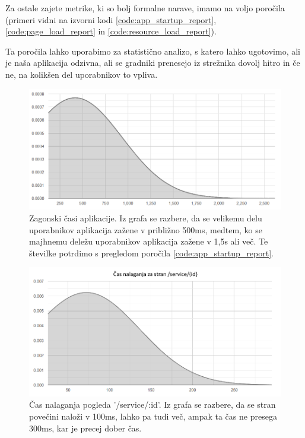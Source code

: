 \documentclass[a4paper, 12pt]{book}
\begin{document}
Za ostale zajete metrike, ki so bolj formalne narave, imamo na voljo poročila (primeri vidni na  izvorni kodi \ref{code:app_startup_report}, \ref{code:page_load_report} in \ref{code:resource_load_report}).

Ta poročila lahko uporabimo za statistično analizo, s katero lahko ugotovimo, ali je naša aplikacija odzivna, ali se gradniki prenesejo iz strežnika dovolj hitro in če ne, na kolikšen del uporabnikov to vpliva.

\begin{figure}[h]
	\begin{center}
		\includegraphics[width=1\textwidth]{app_startup_graph.png}
	\end{center}
	\caption{Zagonski časi aplikacije. Iz grafa se razbere, da se velikemu delu uporabnikov aplikacija zažene v približno 500ms, medtem, ko se majhnemu deležu uporabnikov aplikacija zažene v 1,5s ali več. Te številke potrdimo s pregledom poročila \ref{code:app_startup_report}.}
	\label{img:graph_app_startup}
\end{figure}

\begin{figure}[h]
	\begin{center}
		\includegraphics[width=1\textwidth]{page_load_graph_service_details.png}
	\end{center}
	\caption{Čas nalaganja pogleda '/service/:id'. Iz grafa se razbere, da se stran povečini naloži v 100ms, lahko pa tudi več, ampak ta čas ne presega 300ms, kar je precej dober čas.}
	\label{img:graph_page_load}
\end{figure}
\end{document}
